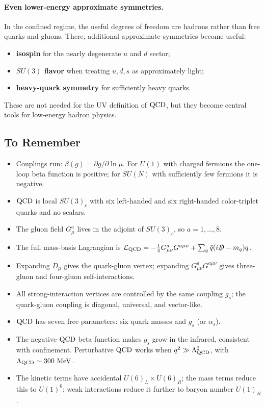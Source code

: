 \documentclass[../main.tex]{subfiles}
\begin{document}
\paragraph{Even lower-energy approximate symmetries.}
In the confined regime, the useful degrees of freedom are hadrons rather than free quarks and gluons. There, additional approximate symmetries become useful:
\begin{itemize}
  \item \textbf{isospin} for the nearly degenerate $u$ and $d$ sector;
  \item \textbf{$SU(3)$ flavor} when treating $u,d,s$ as approximately light;
  \item \textbf{heavy-quark symmetry} for sufficiently heavy quarks.
\end{itemize}
These are not needed for the UV definition of $\mathrm{QCD}$, but they become central tools for low-energy hadron physics.

\subsection*{To Remember}

\begin{itemize}
  \item Couplings run: $\beta(g)=\partial g/\partial\ln\mu$. For $U(1)$ with charged fermions the one-loop beta function is positive; for $SU(N)$ with sufficiently few fermions it is negative.
  \item $\mathrm{QCD}$ is local $SU(3)_c$ with six left-handed and six right-handed color-triplet quarks and no scalars.
  \item The gluon field $G_\mu^a$ lives in the adjoint of $SU(3)_c$, so $a=1,\ldots,8$.
  \item The full mass-basis Lagrangian is $\mathcal{L}_{\mathrm{QCD}}= -\frac14G_{\mu\nu}^aG^{a\mu\nu}+\sum_q\bar q(i\slashed D-m_q)q$.
  \item Expanding $D_\mu$ gives the quark-gluon vertex; expanding $G_{\mu\nu}^aG^{a\mu\nu}$ gives three-gluon and four-gluon self-interactions.
  \item All strong-interaction vertices are controlled by the same coupling $g_s$; the quark-gluon coupling is diagonal, universal, and vector-like.
  \item $\mathrm{QCD}$ has seven free parameters: six quark masses and $g_s$ (or $\alpha_s$).
  \item The negative $\mathrm{QCD}$ beta function makes $g_s$ grow in the infrared, consistent with confinement. Perturbative $\mathrm{QCD}$ works when $q^2\gg\Lambda_{\mathrm{QCD}}^2$, with $\Lambda_{\QCD}\sim300\ \mathrm{MeV}$.
  \item The kinetic terms have accidental $U(6)_L\times U(6)_R$; the mass terms reduce this to $U(1)^6$; weak interactions reduce it further to baryon number $U(1)_B$.
\end{itemize}
\end{document}
